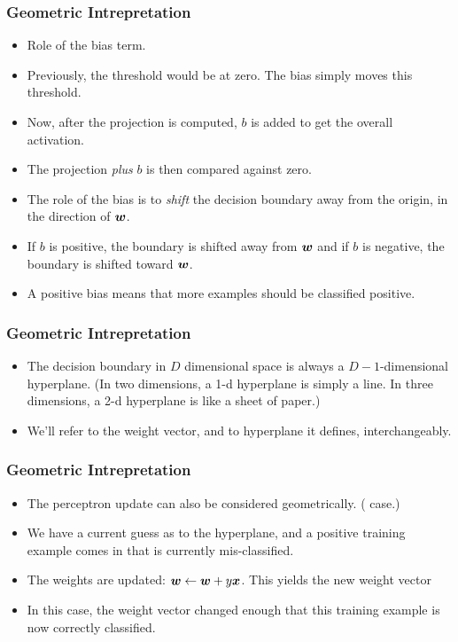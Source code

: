 \documentclass[trans]{beamer}
\begin{document}
\begin{frame}
  \frametitle{Geometric Intrepretation}
\begin{itemize}
\item
Role of the bias term.
\item 
Previously, the threshold would be at zero.  
 The bias simply moves
this threshold. 
\item Now, after the projection is computed, $b$ is added
to get the overall activation.
\item  The projection \emph{plus} $b$ is then
compared against zero.
\item The role of the bias is to
\emph{shift} the decision boundary away from the origin, in the
direction of ${\boldsymbol{w}}$.  
\item If $b$ is
positive, the boundary is shifted away from ${\boldsymbol{w}}$ and if $b$ is
negative, the boundary is shifted toward ${\boldsymbol{w}}$.  
\item A positive
bias means that more examples should be classified positive. 
\end{itemize}
\end{frame}

\begin{frame}
  \frametitle{Geometric Intrepretation}
\begin{itemize}
\item
The decision boundary in
$D$ dimensional space is always a $D-1$-dimensional hyperplane.
(In two dimensions, a 1-d hyperplane is simply a line.  In three
dimensions, a 2-d hyperplane is like a sheet of paper.) 
\item We'll
refer to the weight vector, and to hyperplane it defines,
interchangeably.
\end{itemize}
\end{frame}

\begin{frame}
  \frametitle{Geometric Intrepretation}
\begin{itemize}
\item
The perceptron update can also be considered geometrically.  ( case.) 
\item We have a current
guess as to the hyperplane, and  a positive training example comes in
that is currently mis-classified.  
\item The weights are updated: ${\boldsymbol{w}}
\leftarrow {\boldsymbol{w}} + y {\boldsymbol{x}}$.  This yields the new weight vector
\item In this case, the weight vector changed enough
that this training example is now correctly classified.
\end{itemize}
\end{frame}
\end{document}
